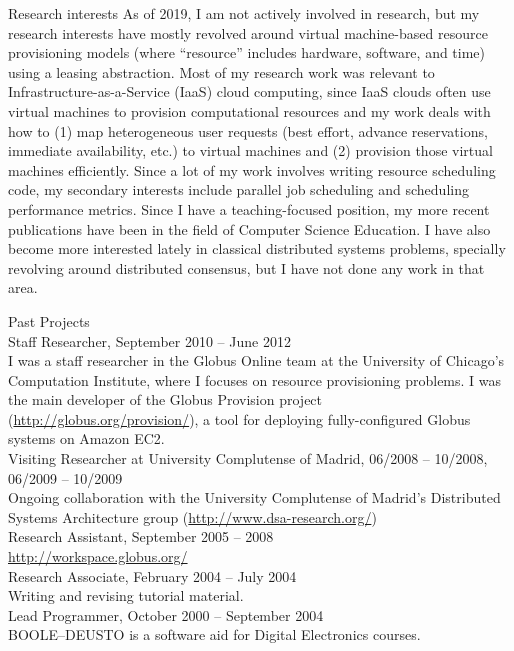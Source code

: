 \documentclass{resume}
\begin{document}
\begin{category}{Research interests}
\citembullet As of 2019, I am not actively involved in research, but my research interests have mostly revolved around virtual machine-based resource provisioning models (where ``resource'' includes hardware, software, and time) using a leasing abstraction. Most of my research work was relevant to Infrastructure-as-a-Service (IaaS) cloud computing, since IaaS clouds often use virtual machines to provision computational resources and my work deals with how to (1) map heterogeneous user requests (best effort, advance reservations, immediate availability, etc.) to virtual machines and (2) provision those virtual machines efficiently. Since a lot of my work involves writing resource scheduling code, my secondary interests include parallel job scheduling and scheduling performance metrics.
\citembullet Since I have a teaching-focused position, my more recent publications have been in the field of Computer Science Education. I have also become more interested lately in classical distributed systems problems, specially revolving around distributed consensus, but I have not done any work in that area.
\end{category}
\begin{category}{Past Projects}
\\
Staff Researcher, September 2010 -- June 2012\\
I was a staff researcher in the Globus Online team at the University of Chicago's Computation Institute, where I focuses on resource provisioning problems. I was the main developer of the Globus Provision project (\url{http://globus.org/provision/}), a tool for deploying fully-configured Globus systems on Amazon EC2.
\\
Visiting Researcher at University Complutense of Madrid, 06/2008 -- 10/2008, 06/2009 -- 10/2009\\
Ongoing collaboration with the University Complutense of Madrid's Distributed Systems Architecture group (\url{http://www.dsa-research.org/})
\\
Research Assistant, September 2005 -- 2008\\
\url{http://workspace.globus.org/}
\\
Research Associate, February 2004 -- July 2004\\
Writing and revising tutorial material.
\\ 
Lead Programmer, October 2000 -- September 2004\\
\textsf{BOOLE--DEUSTO} is a software aid for Digital Electronics courses.
\end{category}
\end{document}
